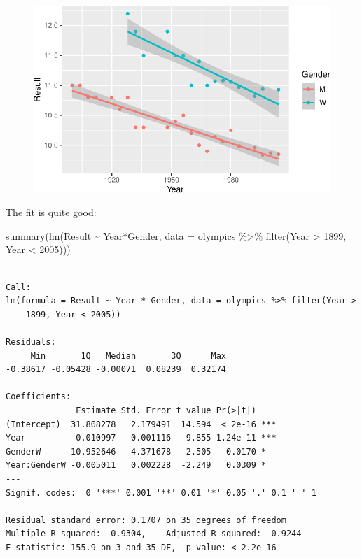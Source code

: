 \documentclass[
  letterpaper,
  DIV=11,
  numbers=noendperiod]{scrreprt}
\newenvironment{Shaded}{\begin{snugshade}}{\end{snugshade}}
\newcommand{\AttributeTok}[1]{\textcolor[rgb]{0.40,0.45,0.13}{#1}}
\newcommand{\DecValTok}[1]{\textcolor[rgb]{0.68,0.00,0.00}{#1}}
\newcommand{\FunctionTok}[1]{\textcolor[rgb]{0.28,0.35,0.67}{#1}}
\newcommand{\NormalTok}[1]{\textcolor[rgb]{0.00,0.23,0.31}{#1}}
\newcommand{\SpecialCharTok}[1]{\textcolor[rgb]{0.37,0.37,0.37}{#1}}
\begin{document}
\begin{figure}[H]

{\centering \includegraphics{./08-linearreg_files/figure-pdf/unnamed-chunk-17-1.pdf}

}

\end{figure}

The fit is quite good:

\begin{Shaded}
\begin{Highlighting}[]
\FunctionTok{summary}\NormalTok{(}\FunctionTok{lm}\NormalTok{(Result }\SpecialCharTok{\textasciitilde{}}\NormalTok{ Year}\SpecialCharTok{*}\NormalTok{Gender,}
  \AttributeTok{data =}\NormalTok{ olympics }\SpecialCharTok{\%\textgreater{}\%} \FunctionTok{filter}\NormalTok{(Year }\SpecialCharTok{\textgreater{}} \DecValTok{1899}\NormalTok{, Year }\SpecialCharTok{\textless{}} \DecValTok{2005}\NormalTok{)))}
\end{Highlighting}
\end{Shaded}

\begin{verbatim}

Call:
lm(formula = Result ~ Year * Gender, data = olympics %>% filter(Year > 
    1899, Year < 2005))

Residuals:
     Min       1Q   Median       3Q      Max 
-0.38617 -0.05428 -0.00071  0.08239  0.32174 

Coefficients:
              Estimate Std. Error t value Pr(>|t|)    
(Intercept)  31.808278   2.179491  14.594  < 2e-16 ***
Year         -0.010997   0.001116  -9.855 1.24e-11 ***
GenderW      10.952646   4.371678   2.505   0.0170 *  
Year:GenderW -0.005011   0.002228  -2.249   0.0309 *  
---
Signif. codes:  0 '***' 0.001 '**' 0.01 '*' 0.05 '.' 0.1 ' ' 1

Residual standard error: 0.1707 on 35 degrees of freedom
Multiple R-squared:  0.9304,    Adjusted R-squared:  0.9244 
F-statistic: 155.9 on 3 and 35 DF,  p-value: < 2.2e-16
\end{verbatim}
\end{document}

